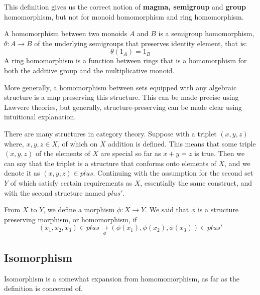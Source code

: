 This definition gives us the correct notion of \textbf{magma, semigroup} and \textbf{group} homomorphism, but not for monoid homomorphism and ring homomorphism. 

\begin{definition}
    A homomorphism between two monoids $A$ and $B$ is a semigroup homomorphism, $\theta: A \longrightarrow B$ of the underlying semigroups that preserves identity element, that is: 
    \begin{equation*}
        \theta(1_{A}) = 1_{B}
    \end{equation*}
    A ring homomorphism is a function between rings that is a homomorphism for both the additive group and the multiplicative monoid.   
\end{definition}

More generally, a homomorphism between sets equipped with any algebraic structure is a map preserving this structure. This can be made precise using Lawvere theories, but generally, structure-preserving can be made clear using intuitional explanation. 

There are many structures in category theory. Suppose with a triplet $(x,y,z)$ where, $x,y,z\in X$, of which on $X$ addition is defined. This means that some triple $(x,y,z)$ of the elements of $X$ are special so far as $x+y=z$ is true. Then we can say that the triplet is a structure that conforms onto elements of $X$, and we denote it as $(x,y,z)\in plus$. Continuing with the assumption for the second set $Y$ of which satisfy certain requirements as $X$, essentially the same construct, and with the second structure named $plus'$. 

From $X$ to $Y$, we define a morphism $\phi:X \longrightarrow Y$. We said that $\phi$ is a structure preserving morphism, or homomorphism, if 
\begin{equation*}
    (x_1,x_2,x_3) \in plus \underset{\phi}{\longrightarrow} (\phi(x_1),\phi(x_2),\phi(x_3)) \in plus'
\end{equation*}
\subsection{Isomorphism}
Isomorphism is a somewhat expansion from homomomorphism, as far as the definition is concerned of. 

